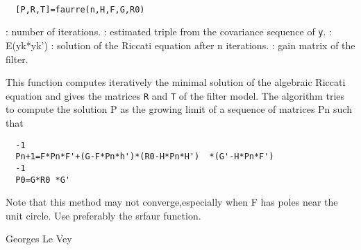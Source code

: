 
\begin{mandesc}
   \\ %
\end{mandesc}
\begin{calling_sequence}
\begin{verbatim}
  [P,R,T]=faurre(n,H,F,G,R0)  
\end{verbatim}
\end{calling_sequence}
\begin{parameters}
  \begin{varlist}
    : number of iterations.
    : estimated triple from the covariance sequence of \verb!y!.
    : E(yk*yk')
    : solution of the Riccati equation after n iterations.
    : gain matrix of the filter.
  \end{varlist}
\end{parameters}
\begin{mandescription}
  This function computes iteratively the minimal solution of the algebraic
  Riccati equation and gives the matrices \verb!R! and \verb!T! of the 
  filter model.
  The algorithm tries to compute the solution P as the growing limit of a
  sequence of matrices Pn such that
\begin{verbatim}
  -1
  Pn+1=F*Pn*F'+(G-F*Pn*h')*(R0-H*Pn*H')  *(G'-H*Pn*F')
  -1
  P0=G*R0 *G'
\end{verbatim}
Note that this method may not converge,especially when F has poles
near the unit circle. Use preferably the srfaur function.
\end{mandescription}
\begin{manseealso}
      
\end{manseealso}
\begin{authors}
  Georges Le Vey
\end{authors}
